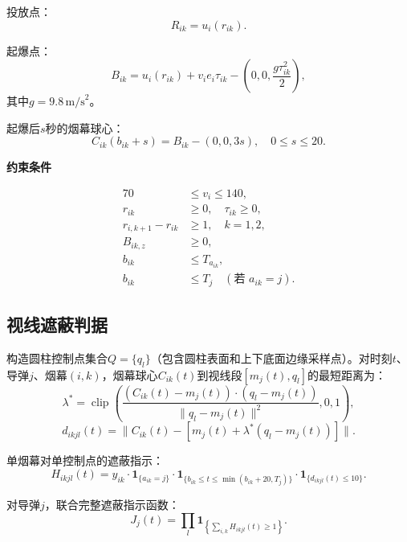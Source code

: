 \documentclass[12pt,a4paper]{article}
\begin{document}
	投放点：
	\begin{equation}
		R_{ik}=u_i(r_{ik}).
	\end{equation}
	
	起爆点：
	\begin{equation}
		B_{ik}=u_i(r_{ik})+v_i e_i\tau_{ik}-\left(0,0,\frac{g\tau_{ik}^2}{2}\right),
	\end{equation}
	其中$g=9.8\,\text{m/s}^2$。
	
	起爆后$s$秒的烟幕球心：
	\begin{equation}
		C_{ik}(b_{ik}+s)=B_{ik}-(0,0,3s),\quad 0\leq s\leq20.
	\end{equation}
	
	\textbf{约束条件}
	
	\begin{align}
		70&\leq v_i\leq140,\\
		r_{ik}&\geq0,\quad\tau_{ik}\geq0,\\
		r_{i,k+1}-r_{ik}&\geq1,\quad k=1,2,\\
		B_{ik,z}&\geq0,\\
		b_{ik}&\leq T_{a_{ik}},\\
		b_{ik}&\leq T_j\quad(\text{若 }a_{ik}=j).
	\end{align}
	
	\subsection{视线遮蔽判据}
	
	构造圆柱控制点集合$Q=\{q_l\}$（包含圆柱表面和上下底面边缘采样点）。对时刻$t$、导弹$j$、烟幕$(i,k)$，烟幕球心$C_{ik}(t)$到视线段$[m_j(t),q_l]$的最短距离为：
	\begin{equation}
		\lambda^*=\operatorname{clip}\left(\frac{(C_{ik}(t)-m_j(t))\cdot(q_l-m_j(t))}{\|q_l-m_j(t)\|^2},0,1\right),
	\end{equation}
	\begin{equation}
		d_{ikjl}(t)=\|C_{ik}(t)-[m_j(t)+\lambda^*(q_l-m_j(t))]\|.
	\end{equation}
	
	单烟幕对单控制点的遮蔽指示：
	\begin{equation}
		H_{ikjl}(t)=y_{ik}\cdot\mathbf{1}_{\{a_{ik}=j\}}
		\cdot\mathbf{1}_{\{b_{ik}\leq t\leq \min(b_{ik}+20,T_j)\}}
		\cdot\mathbf{1}_{\{d_{ikjl}(t)\leq10\}}.
	\end{equation}
	
	
	
	对导弹$j$，联合完整遮蔽指示函数：
	\begin{equation}
		J_j(t)=\prod_l \mathbf{1}_{\left\{\sum_{i,k} H_{ikjl}(t)\geq1\right\}}.
	\end{equation}
	
\end{document}
